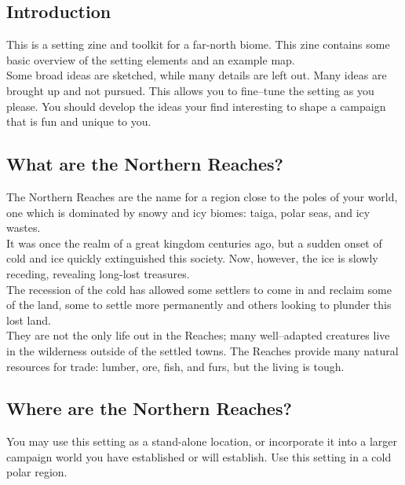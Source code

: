 \documentclass[notitlepage]{article}
\begin{document}
\begin{multicols}{2}
  
\section{Introduction}

This is a setting zine and toolkit for a far-north biome.
This zine contains some basic overview of the setting elements and an example map. \\

Some broad ideas are sketched, while many details are left out.
Many ideas are brought up and not pursued.
This allows you to fine--tune the setting as you please.
You should develop the ideas your find interesting to shape a campaign that is fun and unique to you.

\subsection*{What are the Northern Reaches?}

The Northern Reaches are the name for a region close to the poles of your world, one which is dominated by snowy and icy biomes: taiga, polar seas, and icy wastes. \\

It was once the realm of a great kingdom centuries ago, but a sudden onset of cold and ice quickly extinguished this society.
Now, however, the ice is slowly receding, revealing long-lost treasures. \\

The recession of the cold has allowed some settlers to come in and reclaim some of the land, some to settle more permanently and others looking to plunder this lost land. \\

They are not the only life out in the Reaches; many well--adapted creatures live in the wilderness outside of the settled towns.
The Reaches provide many natural resources for trade: lumber, ore, fish, and furs, but the living is tough.

\subsection*{Where are the Northern Reaches?}

You may use this setting as a stand-alone location, or incorporate it into a larger campaign world you have established or will establish.
Use this setting in a cold polar region.


\end{multicols}
\end{document}
